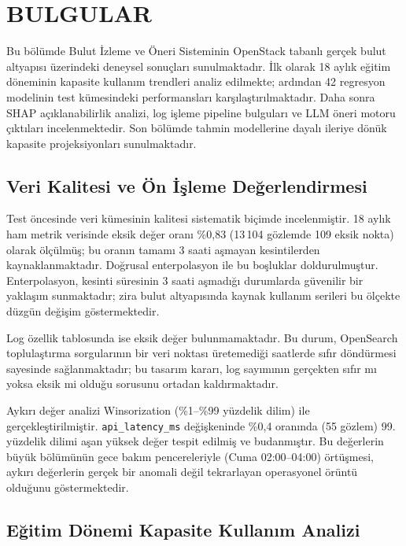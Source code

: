 \chapter{BULGULAR}
\label{ch:bulgular}

Bu bölümde Bulut İzleme ve Öneri Sisteminin OpenStack tabanlı gerçek bulut altyapısı üzerindeki deneysel sonuçları sunulmaktadır.
İlk olarak 18 aylık eğitim döneminin kapasite kullanım trendleri analiz edilmekte; ardından 42 regresyon modelinin test kümesindeki performansları karşılaştırılmaktadır.
Daha sonra SHAP açıklanabilirlik analizi, log işleme pipeline bulguları ve LLM öneri motoru çıktıları incelenmektedir.
Son bölümde tahmin modellerine dayalı ileriye dönük kapasite projeksiyonları sunulmaktadır.


\section{Veri Kalitesi ve Ön İşleme Değerlendirmesi}
\label{sec:veri-kalite}

Test öncesinde veri kümesinin kalitesi sistematik biçimde incelenmiştir.
18 aylık ham metrik verisinde eksik değer oranı \%0{,}83 (13\,104 gözlemde 109 eksik nokta) olarak ölçülmüş; bu oranın tamamı 3 saati aşmayan kesintilerden kaynaklanmaktadır.
Doğrusal enterpolasyon ile bu boşluklar doldurulmuştur.
Enterpolasyon, kesinti süresinin 3 saati aşmadığı durumlarda güvenilir bir yaklaşım sunmaktadır; zira bulut altyapısında kaynak kullanım serileri bu ölçekte düzgün değişim göstermektedir.

Log özellik tablosunda ise eksik değer bulunmamaktadır.
Bu durum, OpenSearch toplulaştırma sorgularının bir veri noktası üretemediği saatlerde sıfır döndürmesi sayesinde sağlanmaktadır; bu tasarım kararı, log sayımının gerçekten sıfır mı yoksa eksik mi olduğu sorusunu ortadan kaldırmaktadır.

Aykırı değer analizi Winsorization (\%1--\%99 yüzdelik dilim) ile gerçekleştirilmiştir.
\texttt{api\_latency\_ms} değişkeninde \%0{,}4 oranında (55 gözlem) 99. yüzdelik dilimi aşan yüksek değer tespit edilmiş ve budanmıştır.
Bu değerlerin büyük bölümünün gece bakım pencereleriyle (Cuma 02:00--04:00) örtüşmesi, aykırı değerlerin gerçek bir anomali değil tekrarlayan operasyonel örüntü olduğunu göstermektedir.


\section{Eğitim Dönemi Kapasite Kullanım Analizi}
\label{sec:egitim-trend}

